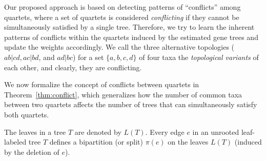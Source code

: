 \documentclass[10pt,a4paper]{article}
\begin{document}
Our proposed approach is based on detecting patterns of ``conflicts'' among quartets, where a set of quartets is considered \textit{conflicting} if they cannot be simultaneously satisfied by a single tree. Therefore, we try to learn the inherent patterns of conflicts within the quartets induced by the estimated gene trees and update the weights accordingly. We call the three alternative topologies ($ab|cd, ac|bd$, and $ad|bc$) for a set $\{a,b,c,d\}$ of four taxa the \textit{topological variants} of each other, and clearly, they are conflicting. 

We now formalize the concept of conflicts between quartets in Theorem~\ref{thm:conflict}, which generalizes how the number of common taxa between two quartets affects the number of trees that can simultaneously satisfy both quartets.


The leaves in a tree $T$ are denoted by $L(T)$.
Every edge $e$ in an unrooted leaf-labeled tree $T$ defines a bipartition (or split) $\pi(e)$ on the leaves $L(T)$ (induced by the deletion of $e$). 
\end{document}
